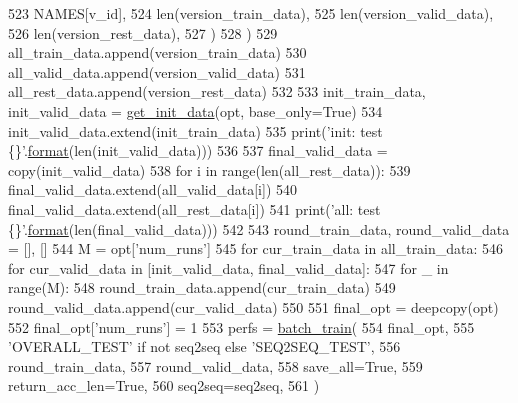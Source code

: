 \begin{DoxyCode}
523                 NAMES[v\_id],
524                 len(version\_train\_data),
525                 len(version\_valid\_data),
526                 len(version\_rest\_data),
527             )
528         )
529         all\_train\_data.append(version\_train\_data)
530         all\_valid\_data.append(version\_valid\_data)
531         all\_rest\_data.append(version\_rest\_data)
532 
533     init\_train\_data, init\_valid\_data = \hyperlink{namespaceprojects_1_1mastering__the__dungeon_1_1mturk_1_1tasks_1_1MTD_1_1run_ae84843b54586b020d47c60d95340e1d7}{get\_init\_data}(opt, base\_only=\textcolor{keyword}{True})
534     init\_valid\_data.extend(init\_train\_data)
535     print(\textcolor{stringliteral}{'init: test \{\}'}.\hyperlink{namespaceparlai_1_1chat__service_1_1services_1_1messenger_1_1shared__utils_a32e2e2022b824fbaf80c747160b52a76}{format}(len(init\_valid\_data)))
536 
537     final\_valid\_data = copy(init\_valid\_data)
538     \textcolor{keywordflow}{for} i \textcolor{keywordflow}{in} range(len(all\_rest\_data)):
539         final\_valid\_data.extend(all\_valid\_data[i])
540         final\_valid\_data.extend(all\_rest\_data[i])
541     print(\textcolor{stringliteral}{'all: test \{\}'}.\hyperlink{namespaceparlai_1_1chat__service_1_1services_1_1messenger_1_1shared__utils_a32e2e2022b824fbaf80c747160b52a76}{format}(len(final\_valid\_data)))
542 
543     round\_train\_data, round\_valid\_data = [], []
544     M = opt[\textcolor{stringliteral}{'num\_runs'}]
545     \textcolor{keywordflow}{for} cur\_train\_data \textcolor{keywordflow}{in} all\_train\_data:
546         \textcolor{keywordflow}{for} cur\_valid\_data \textcolor{keywordflow}{in} [init\_valid\_data, final\_valid\_data]:
547             \textcolor{keywordflow}{for} \_ \textcolor{keywordflow}{in} range(M):
548                 round\_train\_data.append(cur\_train\_data)
549                 round\_valid\_data.append(cur\_valid\_data)
550 
551     final\_opt = deepcopy(opt)
552     final\_opt[\textcolor{stringliteral}{'num\_runs'}] = 1
553     perfs = \hyperlink{namespaceprojects_1_1mastering__the__dungeon_1_1mturk_1_1tasks_1_1MTD_1_1run_a1b5b55764d0ead5087efdcc429514c3e}{batch\_train}(
554         final\_opt,
555         \textcolor{stringliteral}{'OVERALL\_TEST'} \textcolor{keywordflow}{if} \textcolor{keywordflow}{not} seq2seq \textcolor{keywordflow}{else} \textcolor{stringliteral}{'SEQ2SEQ\_TEST'},
556         round\_train\_data,
557         round\_valid\_data,
558         save\_all=\textcolor{keyword}{True},
559         return\_acc\_len=\textcolor{keyword}{True},
560         seq2seq=seq2seq,
561     )

\end{DoxyCode}
